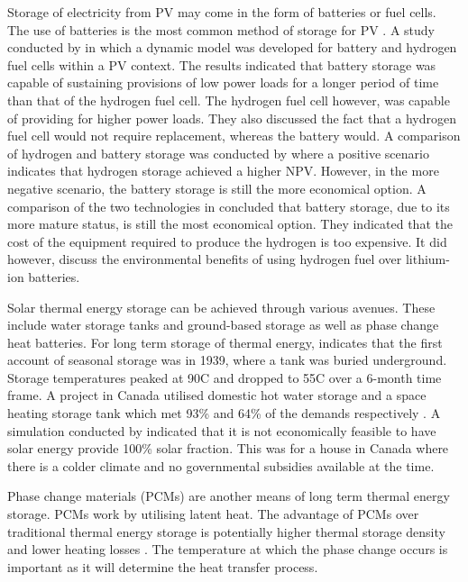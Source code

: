 Storage of electricity from PV may come in the form of batteries or fuel 
cells. The use of batteries is the most common method of storage for PV \cite{StoragePVED}. 
A study conducted by \cite{DOUGLAS2016104} in which a dynamic model was developed for battery 
and hydrogen fuel cells within a PV context. The results indicated that 
battery storage was capable of sustaining provisions of low power loads for a 
longer period of time than that of the hydrogen fuel cell. The hydrogen fuel 
cell however, was capable of providing for higher power loads. They also 
discussed the fact that a hydrogen fuel cell would not require replacement, 
whereas the battery would. A comparison of hydrogen and battery storage was 
conducted by \cite{ZHANG2017397} where a positive scenario indicates that hydrogen storage 
achieved a higher NPV. However, in the more negative scenario, the battery 
storage is still the more economical option. A comparison of the two 
technologies in \cite{BELMONTE201621427} concluded that battery storage, due to its more mature 
status, is still the most economical option.  They indicated that the cost of 
the equipment required to produce the hydrogen is too expensive. It did 
however, discuss the environmental benefits of using hydrogen fuel over 
lithium-ion batteries.

Solar thermal energy storage can be achieved through various avenues. 
These include water storage tanks and ground-based storage as well as phase 
change heat batteries. For long term storage of thermal energy, \cite{PINEL20113341} 
indicates that the first account of seasonal storage was in 1939, where a 
tank was buried underground. Storage temperatures peaked at 90{\degree}C and dropped 
to 55{\degree}C over a 6-month time frame. A project in Canada utilised domestic hot 
water storage and a space heating storage tank which met 93\% and 64\% of the 
demands respectively \cite{cmhc}. A simulation conducted by \cite{Hugo} indicated that it 
is not economically feasible to have solar energy provide 100\% solar fraction. 
This was for a house in Canada where there is a colder climate and no 
governmental subsidies available at the time. 

Phase change materials (PCMs) are another means of long term thermal energy 
storage. PCMs work by utilising latent heat. The advantage of PCMs over 
traditional thermal energy storage is potentially higher thermal storage 
density and lower heating losses \cite{ALABIDI20125802}. The temperature at which the phase change occurs is important as it will determine the heat transfer 
process.

